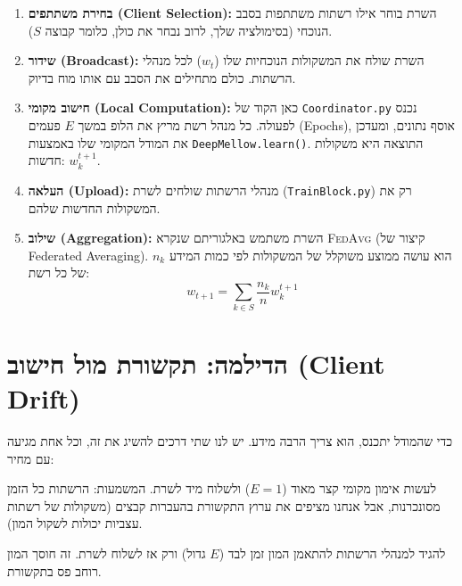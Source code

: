 \documentclass[11pt,a4paper]{article}
\newcommand{\FedAvg}{\textsc{FedAvg}}
\begin{document}
\begin{enumerate}[label=\textbf{\arabic*.}]
  \item \textbf{בחירת משתתפים (Client Selection):}
    השרת בוחר אילו רשתות משתתפות בסבב הנוכחי (בסימולציה שלך, לרוב נבחר את כולן, כלומר קבוצה $S$).

  \item \textbf{שידור (Broadcast):}
    השרת שולח את המשקולות הנוכחיות שלו ($w_t$) לכל מנהלי הרשתות.
    כולם מתחילים את הסבב עם אותו מוח בדיוק.

  \item \textbf{חישוב מקומי (Local Computation):}
    כאן הקוד של \texttt{Coordinator.py} נכנס לפעולה.
    כל מנהל רשת מריץ את הלופ במשך $E$ פעמים (Epochs), אוסף נתונים, ומעדכן את המודל המקומי שלו באמצעות \texttt{DeepMellow.learn()}.
    התוצאה היא משקולות חדשות: $w_k^{t+1}$.

  \item \textbf{העלאה (Upload):}
    מנהלי הרשתות שולחים לשרת (\texttt{TrainBlock.py}) רק את המשקולות החדשות שלהם.

  \item \textbf{שילוב (Aggregation):}
    השרת משתמש באלגוריתם שנקרא \FedAvg{} (קיצור של Federated Averaging).
    הוא עושה ממוצע משוקלל של המשקולות לפי כמות המידע $n_k$ של כל רשת:
    \begin{equation}
      w_{t+1} = \sum_{k \in S} \frac{n_k}{n} w_k^{t+1}
      \label{eq:fedavg-round}
    \end{equation}
\end{enumerate}

\section{הדילמה: תקשורת מול חישוב (Client Drift)}

כדי שהמודל יתכנס, הוא צריך הרבה מידע.
יש לנו שתי דרכים להשיג את זה, וכל אחת מגיעה עם מחיר:

\begin{description}[style=nextline, leftmargin=3.2cm, labelwidth=3cm]
  \item[\textbf{אפשרות א' (תקשורת גבוהה)}]
    לעשות אימון מקומי קצר מאוד ($E=1$) ולשלוח מיד לשרת.
    המשמעות: הרשתות כל הזמן מסונכרנות, אבל אנחנו מציפים את ערוץ התקשורת בהעברות קבצים (משקולות של רשתות עצביות יכולות לשקול המון).

  \item[\textbf{אפשרות ב' (חישוב גבוה)}]
    להגיד למנהלי הרשתות להתאמן המון זמן לבד ($E$ גדול) ורק אז לשלוח לשרת.
    זה חוסך המון רוחב פס בתקשורת.
\end{description}
\end{document}
